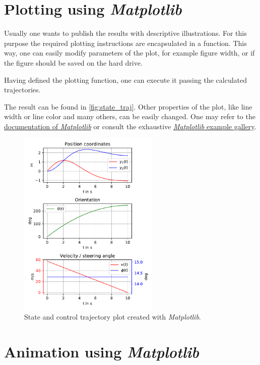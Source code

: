 \documentclass[a4paper,11pt,headinclude=true,headsepline,parskip=half,DIV=13]{scrartcl}
\newcommand{\listcode}[3]{}
\newcommand{\listcodeplot}[2]{\listcode{#1}{#2}{../sim/01_car_example_plotting.py}}
\newcommand{\mpl}{\emph{Matplotlib}\xspace}
\begin{document}
\section{Plotting using \mpl} \label{sec:plot}
Usually one wants to publish the results with descriptive illustrations. For this purpose the required plotting instructions are encapsulated in a function. This way, one can easily modify parameters of the plot, for example figure width, or if the figure should be saved on the hard drive.
\listcodeplot{63}{132}
Having defined the plotting function, one can execute it passing the calculated trajectories.
\listcodeplot{146}{148}
The result can be found in \autoref{fig:state_traj}. Other properties of the plot, like line width or line color and many others, can be easily changed. One may refer to the \href{https://matplotlib.org/api/pyplot_summary.html}{documentation of \mpl} or consult the exhaustive \href{https://matplotlib.org/gallery/index.html}{\mpl example gallery}.
\begin{figure}[h!]
\label{fig:state_traj}
   \centering      
   \includegraphics[width=0.6\textwidth]{img/state_trajectory.pdf}      
 \caption{State and control trajectory plot created with \mpl.}
 \label{fig:Test}
\end{figure} 



\section{Animation using \mpl} \label{sec:animation}
\end{document}

